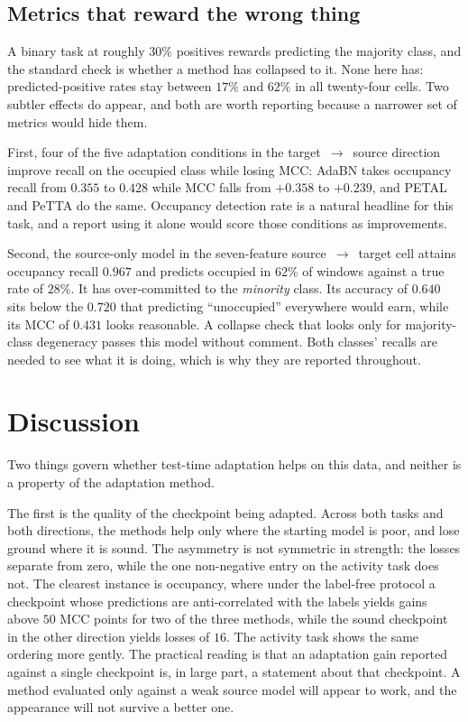 \documentclass[a4paper,fleqn]{cas-dc}
\begin{document}
\subsection{Metrics that reward the wrong thing}

A binary task at roughly $30\%$ positives rewards predicting the majority class, and the
standard check is whether a method has collapsed to it. None here has: predicted-positive
rates stay between $17\%$ and $62\%$ in all twenty-four cells. Two subtler effects do
appear, and both are worth reporting because a narrower set of metrics would hide them.

First, four of the five adaptation conditions in the target~$\to$~source direction improve
recall on the occupied class while losing MCC: AdaBN takes occupancy recall from $0.355$ to
$0.428$ while MCC falls from $+0.358$ to $+0.239$, and PETAL and PeTTA do the same.
Occupancy detection rate is a natural headline for this task, and a report using it alone
would score those conditions as improvements.

Second, the source-only model in the seven-feature source~$\to$~target cell attains
occupancy recall $0.967$ and predicts occupied in $62\%$ of windows against a true rate of
$28\%$. It has over-committed to the \emph{minority} class. Its accuracy of $0.640$ sits
below the $0.720$ that predicting ``unoccupied'' everywhere would earn, while its MCC of
$0.431$ looks reasonable. A collapse check that looks only for majority-class degeneracy
passes this model without comment. Both classes' recalls are needed to see what it is
doing, which is why they are reported throughout.

\section{Discussion}
\label{sec:discussion}

Two things govern whether test-time adaptation helps on this data, and neither is a
property of the adaptation method.

The first is the quality of the checkpoint being adapted. Across both tasks and both
directions, the methods help only where the starting model is poor, and lose ground where
it is sound. The asymmetry is not symmetric in strength: the losses separate from zero,
while the one non-negative entry on the activity task does not.
The clearest instance is occupancy, where under the label-free protocol a checkpoint
whose predictions are anti-correlated with the labels yields gains above $50$ MCC points
for two of the three methods, while the sound checkpoint in the other direction yields
losses of $16$. The
activity task shows the same ordering more gently. The practical reading is that an
adaptation gain reported against a single checkpoint is, in large part, a statement about
that checkpoint. A method evaluated only against a weak source model will appear to work,
and the appearance will not survive a better one.
\end{document}
